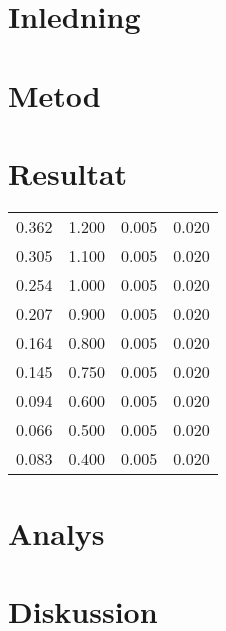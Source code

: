 \documentclass[10pt, titlepage, oneside, a4paper]{article}
\begin{document}
    
	\section{Inledning}
	\section{Metod}
	\section{Resultat}
    \begin{tabular}{llll}

        0.362 & 1.200 & 0.005 & 0.020\\
        0.305 & 1.100 & 0.005 & 0.020\\
        0.254 & 1.000 & 0.005 & 0.020\\
        0.207 & 0.900 & 0.005 & 0.020\\
        0.164 & 0.800 & 0.005 & 0.020\\
        0.145 & 0.750 & 0.005 & 0.020\\
        0.094 & 0.600 & 0.005 & 0.020\\
        0.066 & 0.500 & 0.005 & 0.020\\
        0.083 & 0.400 & 0.005 & 0.020\\
        
    \end{tabular}
	\section{Analys}
    \section{Diskussion}
\end{document}
